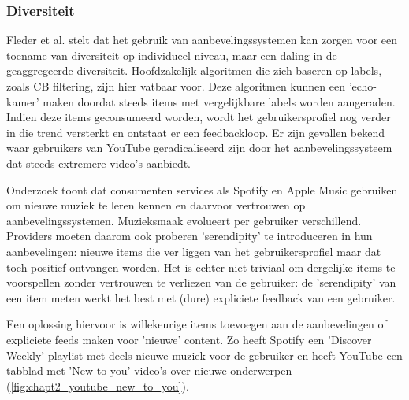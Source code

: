 
\subsubsection{Diversiteit}
Fleder et al. \cite{recsys_diversity} stelt dat het gebruik van aanbevelingssystemen kan zorgen voor een toename van diversiteit op individueel niveau, maar een daling in de geaggregeerde diversiteit. Hoofdzakelijk algoritmen die zich baseren op labels, zoals CB filtering, zijn hier vatbaar voor. Deze algoritmen kunnen een 'echo-kamer' maken doordat steeds items met vergelijkbare labels worden aangeraden. Indien deze items geconsumeerd worden, wordt het gebruikersprofiel nog verder in die trend versterkt en ontstaat er een feedbackloop. Er zijn gevallen bekend waar gebruikers van YouTube geradicaliseerd zijn door het aanbevelingssysteem dat steeds extremere video's aanbiedt.

\cite{youtube_radicalisation} Onderzoek toont dat consumenten services als Spotify en Apple Music gebruiken om nieuwe muziek te leren kennen en daarvoor vertrouwen op aanbevelingssystemen. \cite{recsys_serendipity_music} Muzieksmaak evolueert per gebruiker verschillend. Providers moeten daarom ook proberen 'serendipity' te introduceren in hun aanbevelingen: nieuwe items die ver liggen van het gebruikersprofiel maar dat toch positief ontvangen worden. Het is echter niet triviaal om dergelijke items te voorspellen zonder vertrouwen te verliezen van de gebruiker: de 'serendipity' van een item meten werkt het best met (dure) expliciete feedback van een gebruiker.

Een oplossing hiervoor is willekeurige items toevoegen aan de aanbevelingen of expliciete feeds maken voor 'nieuwe' content. \cite{youtube_randomness, youtube_new_to_you} Zo heeft Spotify een 'Discover Weekly' playlist met deels nieuwe muziek voor de gebruiker en heeft YouTube een tabblad met 'New to you' video's over nieuwe onderwerpen (\autoref{fig:chapt2_youtube_new_to_you}).



